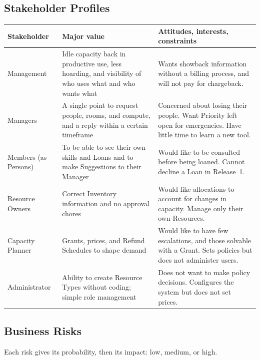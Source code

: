 \subsection{Stakeholder Profiles}

{\footnotesize\renewcommand{\arraystretch}{1.05}
\begin{tabularx}{\textwidth}{@{}L{2.4cm}YY@{}}
\toprule
\textbf{Stakeholder} & \textbf{Major value} & \textbf{Attitudes, interests, constraints} \\
\midrule
Management & Idle capacity back in productive use, less hoarding, and visibility of who uses what and who wants what & Wants showback information without a billing process, and will not pay for chargeback. \\
Managers & A single point to request people, rooms, and compute, and a reply within a certain timeframe & Concerned about losing their people. Want Priority left open for emergencies. Have little time to learn a new tool. \\
Members (as Persons) & To be able to see their own skills and Loans and to make Suggestions to their Manager & Would like to be consulted before being loaned. Cannot decline a Loan in Release~1. \\
Resource Owners & Correct Inventory information and no approval chores & Would like allocations to account for changes in capacity. Manage only their own Resources. \\
Capacity Planner & Grants, prices, and Refund Schedules to shape demand & Would like to have few escalations, and those solvable with a Grant. Sets policies but does not administer users. \\
Administrator & Ability to create Resource Types without coding; simple role management & Does not want to make policy decisions. Configures the system but does not set prices. \\
\bottomrule
\end{tabularx}
}

\subsection{Business Risks}

Each risk gives its probability, then its impact: low, medium, or high.

